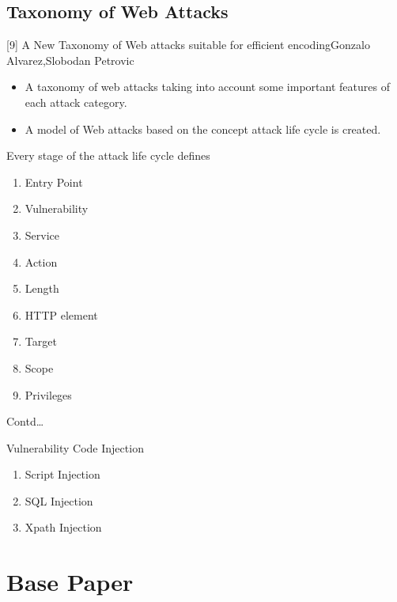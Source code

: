 \documentclass[10pt]{beamer}
\begin{document}
\subsection{Taxonomy of Web Attacks}
\begin{frame}{[9] A New Taxonomy of Web attacks suitable for efficient encoding}{Gonzalo Alvarez,Slobodan Petrovic}
	
	\begin{itemize}
		\item 	A taxonomy of web attacks taking into account some important features of each attack category.\\
		\item 	A model of Web attacks based on the concept attack life cycle is created.\\
	\end{itemize}
	Every stage of the attack life cycle defines
	\begin{enumerate}
		\item Entry Point
		\item Vulnerability
		\item Service
		\item Action
		\item Length
		\item HTTP element
		\item Target
		\item Scope
		\item Privileges
	\end{enumerate}
\end{frame}
\begin{frame}{Contd\dots}
	\begin{block}{Vulnerability}
		Code Injection
		\begin{enumerate}
			\item Script Injection
			\item SQL Injection
			\item Xpath Injection
		\end{enumerate}
	\end{block}
	
\end{frame}


\section{Base Paper}
     
{\1
	\begin{frame}
		\begin{block}{}
			
		\end{block}
	\end{frame}}
\end{document}
